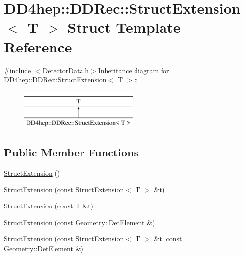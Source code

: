 \hypertarget{struct_d_d4hep_1_1_d_d_rec_1_1_struct_extension}{
\section{DD4hep::DDRec::StructExtension$<$ T $>$ Struct Template Reference}
\label{struct_d_d4hep_1_1_d_d_rec_1_1_struct_extension}
}


{\ttfamily \#include $<$DetectorData.h$>$}Inheritance diagram for DD4hep::DDRec::StructExtension$<$ T $>$::\begin{figure}[H]
\begin{center}
\leavevmode
\includegraphics[height=2cm]{struct_d_d4hep_1_1_d_d_rec_1_1_struct_extension}
\end{center}
\end{figure}
\subsection*{Public Member Functions}
\begin{DoxyCompactItemize}
\item 
\hyperlink{struct_d_d4hep_1_1_d_d_rec_1_1_struct_extension_acd2fbef78c0650cd1a0bd81f525761bb}{StructExtension} ()
\item 
\hyperlink{struct_d_d4hep_1_1_d_d_rec_1_1_struct_extension_ab56b52c2e41637c16f24c14cde46d742}{StructExtension} (const \hyperlink{struct_d_d4hep_1_1_d_d_rec_1_1_struct_extension}{StructExtension}$<$ T $>$ \&t)
\item 
\hyperlink{struct_d_d4hep_1_1_d_d_rec_1_1_struct_extension_a169c4dd3b2b85f44cf5b8ec626fee52a}{StructExtension} (const T \&t)
\item 
\hyperlink{struct_d_d4hep_1_1_d_d_rec_1_1_struct_extension_ab950293a41316a0603953bc9357bd777}{StructExtension} (const \hyperlink{class_d_d4hep_1_1_geometry_1_1_det_element}{Geometry::DetElement} \&)
\item 
\hyperlink{struct_d_d4hep_1_1_d_d_rec_1_1_struct_extension_aaf32001dd03ca30024af4a044f8b3169}{StructExtension} (const \hyperlink{struct_d_d4hep_1_1_d_d_rec_1_1_struct_extension}{StructExtension}$<$ T $>$ \&t, const \hyperlink{class_d_d4hep_1_1_geometry_1_1_det_element}{Geometry::DetElement} \&)
\end{DoxyCompactItemize}


